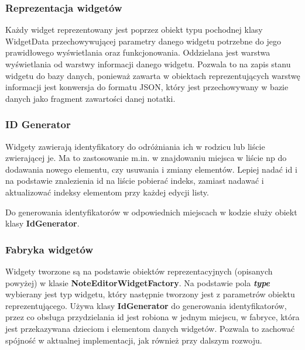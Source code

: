 \subsubsection{Reprezentacja widgetów}

Każdy widget reprezentowany jest poprzez obiekt typu pochodnej klasy WidgetData przechowywującej parametry danego widgetu potrzebne do jego prawidłowego wyświetlania oraz funkcjonowania. Oddzielana jest warstwa wyświetlania od warstwy informacji danego widgetu. Pozwala to na zapis stanu widgetu do bazy danych, ponieważ zawarta w obiektach reprezentujących warstwę informacji jest konwersja do formatu JSON, który jest przechowywany w bazie danych jako fragment zawartości danej notatki.

\subsubsection{ID Generator}

Widgety zawierają identyfikatory do odróżniania ich w rodzicu lub liście zwierającej je. Ma to zastosowanie m.in. w znajdowaniu miejsca w liście np do dodawania nowego elementu, czy usuwania i zmiany elementów. Lepiej nadać id i na podstawie znalezienia id na liście pobierać indeks, zamiast nadawać i aktualizować indeksy elementom przy każdej edycji listy.

Do generowania identyfikatorów w odpowiednich miejscach w kodzie służy obiekt klasy \textbf{IdGenerator}.

\subsubsection{Fabryka widgetów}

Widgety tworzone są na podstawie obiektów reprezentacyjnych (opisanych powyżej) w klasie \textbf{NoteEditorWidgetFactory}. Na podstawie pola \textbf{\textit{type}} wybierany jest typ widgetu, który następnie tworzony jest z parametrów obiektu reprezentującego. Używa klasy \textbf{IdGenerator} do generowania identyfikatorów, przez co obsługa przydzielania id jest robiona w jednym miejscu, w fabryce, która jest przekazywana dzieciom i elementom danych widgetów. Pozwala to zachować spójność w aktualnej implementacji, jak również przy dalszym rozwoju.